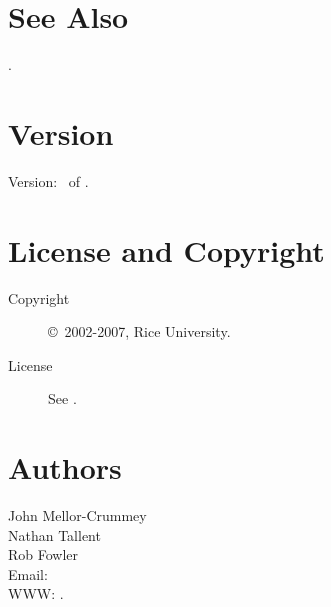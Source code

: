 \documentclass[english]{article}
\begin{document}



\section{See Also}

.

\section{Version}

Version: \Version\ of \Date.

\section{License and Copyright}

\begin{description}
\item[Copyright] \copyright\ 2002-2007, Rice University.
\item[License] See .
\end{description}

\section{Authors}

\noindent
John Mellor-Crummey \\
Nathan Tallent \\
Rob Fowler \\
Email:  \\
WWW: .

\LatexManEnd
\end{document}
